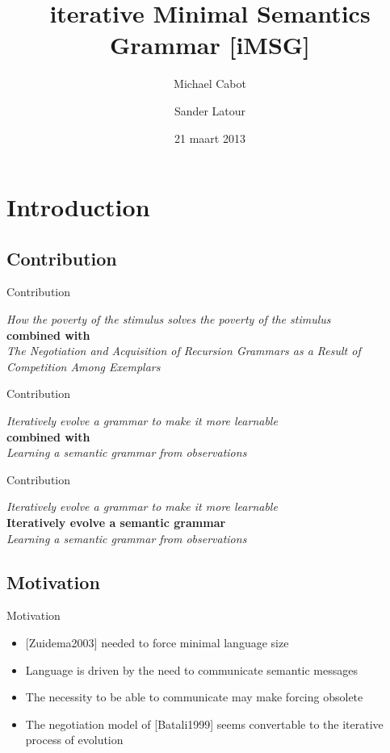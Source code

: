 \documentclass[11pt,a4paper,xcolor=dvipsnames]{beamer}
\author[Michael Cabot \and Sander Latour]{Michael Cabot \and Sander Latour}
\institute{University of Amsterdam}
\title[iMSG]{iterative Minimal Semantics Grammar [iMSG]}
\date{21 maart 2013}
\begin{document}
\begin{frame}
\titlepage
\end{frame}

\begin{frame}
\tableofcontents
\end{frame}

\section{Introduction}
\subsection{Contribution}
\begin{frame}{Contribution}
  \begin{center}
    \textit{How the poverty of the stimulus solves the poverty of the stimulus}\\
    \vfill
    \textbf{combined with}\\
    \vfill
    \textit{The Negotiation and Acquisition of Recursion Grammars as a Result of Competition Among Exemplars}
  \end{center}
\end{frame}

\begin{frame}{Contribution}
  \begin{center}
    \textit{Iteratively evolve a grammar to make it more learnable}\\
    \vfill
    \textbf{combined with}\\
    \vfill
    \textit{Learning a semantic grammar from observations}
  \end{center}
\end{frame}

\begin{frame}{Contribution}
  \begin{center}
    \textit{Iteratively evolve a grammar to make it more learnable}\\
    \vfill
    \textbf{Iteratively evolve a semantic grammar}\\
    \vfill
    \textit{Learning a semantic grammar from observations}
  \end{center}
\end{frame}

\subsection{Motivation}
\begin{frame}{Motivation}
  \begin{itemize}
    \item \hspace*{0pt}[Zuidema2003] needed to force minimal language size
    \item Language is driven by the need to communicate semantic messages
    \item The necessity to be able to communicate may make forcing obsolete
    \item The negotiation model of [Batali1999] seems convertable to the iterative process of evolution
  \end{itemize}
\end{frame}
\end{document}
